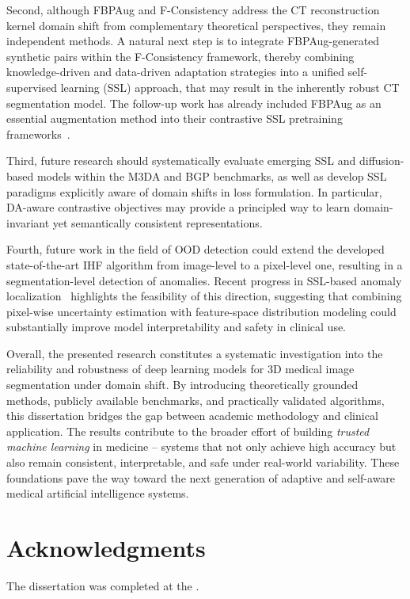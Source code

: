 Second, although FBPAug and F-Consistency address the CT reconstruction kernel domain shift from complementary theoretical perspectives, they remain independent methods. A natural next step is to integrate FBPAug-generated synthetic pairs within the F-Consistency framework, thereby combining knowledge-driven and data-driven adaptation strategies into a unified self-supervised learning (SSL) approach, that may result in the inherently robust CT segmentation model. The follow-up work has already included FBPAug as an essential augmentation method into their contrastive SSL pretraining frameworks~\cite{goncharov2023vox2vec,goncharov2024anatomical}.

Third, future research should systematically evaluate emerging SSL and diffusion-based models within the M3DA and BGP benchmarks, as well as develop SSL paradigms explicitly aware of domain shifts in loss formulation. In particular, DA-aware contrastive objectives may provide a principled way to learn domain-invariant yet semantically consistent representations.

Fourth, future work in the field of OOD detection could extend the developed state-of-the-art IHF algorithm from image-level to a pixel-level one, resulting in a segmentation-level detection of anomalies. Recent progress in SSL-based anomaly localization~\cite{goncharov2025screener} highlights the feasibility of this direction, suggesting that combining pixel-wise uncertainty estimation with feature-space distribution modeling could substantially improve model interpretability and safety in clinical use. 

Overall, the presented research constitutes a systematic investigation into the reliability and robustness of deep learning models for 3D medical image segmentation under domain shift. By introducing theoretically grounded methods, publicly available benchmarks, and practically validated algorithms, this dissertation bridges the gap between academic methodology and clinical application. The results contribute to the broader effort of building \textit{trusted machine learning} in medicine -- systems that not only achieve high accuracy but also remain consistent, interpretable, and safe under real-world variability. These foundations pave the way toward the next generation of adaptive and self-aware medical artificial intelligence systems.


\section*{Acknowledgments}
The dissertation was completed at the {\thesisOrganizationEnNonTitle}.

